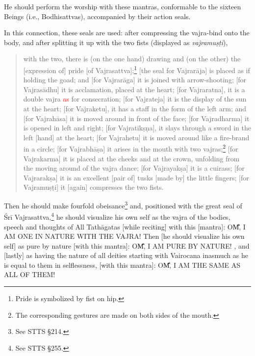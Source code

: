 \documentclass[11pt]{book}
\makeatletter
\def\fakesc#1{%
  \begingroup%
  \xdef\fake@name{\csname\curr@fontshape/\f@size\endcsname}%
  \fontsize{1.3\fontdimen8\fake@name}{\baselineskip}\selectfont%
  \uppercase{#1}%
  \endgroup%
}
\newcommand{\mantra}[1]{\fakesc{#1}}
\newcommand{\red}[1]{\textcolor{red}{#1}}
\newcommand{\skt}[1]{\emph{#1}}
\makeatother
\begin{document}
He should perform the worship with these mantras, conformable to the sixteen Beings (i.e., Bodhisattvas), accompanied by their action seals. 

In this connection, these seals are used: after compressing the vajra-bind onto the body, and after splitting it up with the two fists (displayed as \skt{vajramuṣṭi}),

\begin{verse}
with the two, there is (on the one hand) drawing and (on the other) the [expression of] pride [of Vajrasattva];\footnote{Pride is symbolized by fist on hip.} [the seal for Vajrarāja] is placed as if holding the goad;
and [for Vajrarāga] it is joined with arrow-shooting; [for Vajrasādhu] it is acclamation, placed at the heart;
[for Vajraratna], it is a double vajra \red{as} for consecration; [for Vajrateja] it is the display of the sun at the heart; [for Vajraketu], it has a staff in the form of the left arm; and [for Vajrahāsa] it is moved around in front of the face;
[for Vajradharma] it is opened in left and right; [for Vajratīkṣṇa], it slays through a sword in the left [hand] at the heart; [for Vajrahetu] it is moved around like a fire-brand in a circle; [for Vajrabhāṣa] it arises in the mouth with two vajras;\footnote{The corresponding gestures are made on both sides of the mouth.}
[for Vajrakarma] it is placed at the cheeks and at the crown, unfolding from the moving around of the vajra dance; [for Vajrayakṣa] it is a cuirass; [for Vajrarakṣa] it is an excellent [pair of] tusks [made by] the little fingers; [for Vajramuṣṭi] it [again] compresses the two fists.
\end{verse}

Then he should make fourfold obeisance\footnote{See STTS §214.} and, positioned with the great seal of Śrī Vajrasattva,\footnote{See STTS §255.} he should visualize his own self as the vajra of the bodies, speech and thoughts of All Tathāgatas [while reciting] with this [mantra]: \mantra{om̐, I am one in nature with the vajra!} Then [he should visualize his own self] as pure by nature [with this mantra]: \mantra{om̐, I am pure by nature!}, and [lastly] as having the nature of all deities starting with Vairocana inasmuch as he is equal to them in selflessness, [with this mantra]: \mantra{om̐, I am the same as all of them!} 
\end{document}
